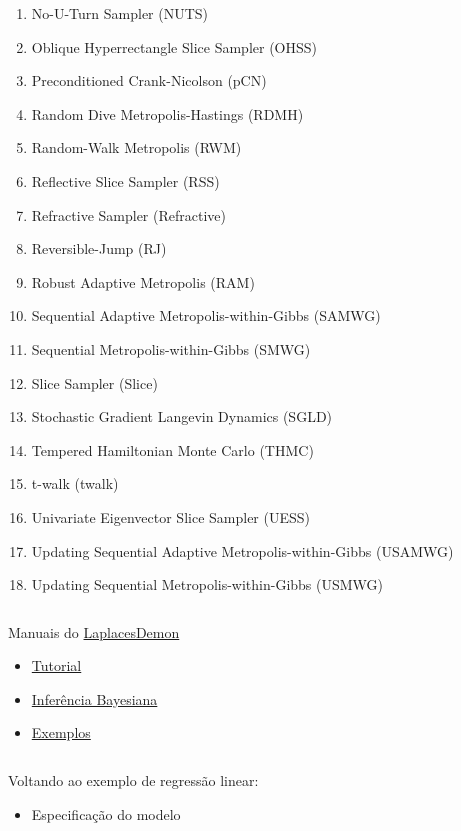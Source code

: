 \documentclass[
]{book}
\providecommand{\tightlist}{%
  \setlength{\itemsep}{0pt}\setlength{\parskip}{0pt}}
\begin{document}
\begin{enumerate}
\item
  No-U-Turn Sampler (NUTS)
\item
  Oblique Hyperrectangle Slice Sampler (OHSS)
\item
  Preconditioned Crank-Nicolson (pCN)
\item
  Random Dive Metropolis-Hastings (RDMH)
\item
  Random-Walk Metropolis (RWM)
\item
  Reflective Slice Sampler (RSS)
\item
  Refractive Sampler (Refractive)
\item
  Reversible-Jump (RJ)
\item
  Robust Adaptive Metropolis (RAM)
\item
  Sequential Adaptive Metropolis-within-Gibbs (SAMWG)
\item
  Sequential Metropolis-within-Gibbs (SMWG)
\item
  Slice Sampler (Slice)
\item
  Stochastic Gradient Langevin Dynamics (SGLD)
\item
  Tempered Hamiltonian Monte Carlo (THMC)
\item
  t-walk (twalk)
\item
  Univariate Eigenvector Slice Sampler (UESS)
\item
  Updating Sequential Adaptive Metropolis-within-Gibbs (USAMWG)
\item
  Updating Sequential Metropolis-within-Gibbs (USMWG)
\end{enumerate}

\(~\)

Manuais do \href{https://cran.r-project.org/web/packages/LaplacesDemon/LaplacesDemon.pdf}{LaplacesDemon}

\begin{itemize}
\item
  \href{https://cran.r-project.org/web/packages/LaplacesDemon/vignettes/LaplacesDemonTutorial.pdf}{Tutorial}
\item
  \href{https://cran.r-project.org/web/packages/LaplacesDemon/vignettes/BayesianInference.pdf}{Inferência Bayesiana}
\item
  \href{https://cran.r-project.org/web/packages/LaplacesDemon/vignettes/Examples.pdf}{Exemplos}
\end{itemize}

\(~\)

Voltando ao exemplo de regressão linear:

\begin{itemize}
\tightlist
\item
  Especificação do modelo
\end{itemize}
\end{document}
